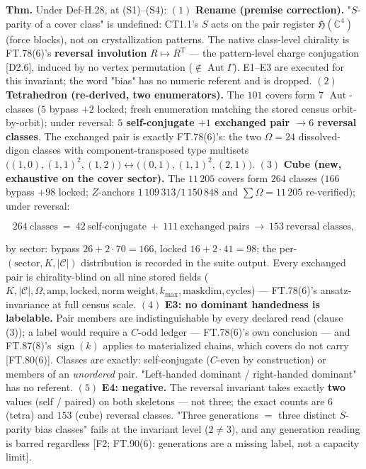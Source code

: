 \begin{theorem}\label{tag:FT-96}
\textbf{Thm.} Under Def-H.28, at (S1)–(S4): $(1)$ \textbf{Rename (premise correction).} "$S$-parity of a cover class" is undefined: CT1.1's $S$ acts on the pair register $\mathfrak H(\mathbb C^4)$ (force blocks), not on crystallization patterns. The native class-level chirality is FT.78(6)'s \textbf{reversal involution} $R\mapsto R^{\mathrm T}$ — the pattern-level charge conjugation [D2.6], induced by no vertex permutation ($\notin\operatorname{Aut}\Gamma$). E1–E3 are executed for this invariant; the word "bias" has no numeric referent and is dropped. $(2)$ \textbf{Tetrahedron (re-derived, two enumerators).} The $101$ covers form $7$ $\operatorname{Aut}$-classes ($5$ bypass $+2$ locked; fresh enumeration matching the stored census orbit-by-orbit); under reversal: \textbf{$5$ self-conjugate $+1$ exchanged pair $\to6$ reversal classes}. The exchanged pair is exactly FT.78(6)'s: the two $\Omega=24$ dissolved-digon classes with component-transposed type multisets $\bigl((1,0),(1,1)^2,(1,2)\bigr)\leftrightarrow\bigl((0,1),(1,1)^2,(2,1)\bigr)$. $(3)$ \textbf{Cube (new, exhaustive on the cover sector).} The $11\,205$ covers form $264$ classes ($166$ bypass $+98$ locked; $Z$-anchors $1\,109\,313/1\,150\,848$ and $\sum\Omega=11\,205$ re-verified); under reversal:

\[
264\ \text{classes}\ =\ 42\ \text{self-conjugate}\ +\ 111\ \text{exchanged pairs}\ \longrightarrow\ 153\ \text{reversal classes},
\]

by sector: bypass $26+2\cdot70=166$, locked $16+2\cdot41=98$; the per-$(\mathrm{sector},K,|\mathcal C|)$ distribution is recorded in the suite output. Every exchanged pair is chirality-blind on all nine stored fields ($K,|\mathcal C|,\Omega,\mathrm{amp},\mathrm{locked},\mathrm{norm\ weight},k_{\max},\mathrm{maskdim},\mathrm{cycles}$) — FT.78(6)'s ansatz-invariance at full census scale. $(4)$ \textbf{E3: no dominant handedness is labelable.} Pair members are indistinguishable by every declared read (clause (3)); a label would require a $C$-odd ledger — FT.78(6)'s own conclusion — and FT.87(8)'s $\operatorname{sign}(k)$ applies to materialized chains, which covers do not carry [FT.80(6)]. Classes are exactly: self-conjugate ($C$-even by construction) or members of an \textit{unordered} pair. "Left-handed dominant / right-handed dominant" has no referent. $(5)$ \textbf{E4: negative.} The reversal invariant takes exactly \textbf{two} values (self / paired) on both skeletons — not three; the exact counts are $6$ (tetra) and $153$ (cube) reversal classes. "Three generations $=$ three distinct $S$-parity bias classes" fails at the invariant level ($2\ne3$), and any generation reading is barred regardless [F2; FT.90(6): generations are a missing label, not a capacity limit].


\end{theorem}
